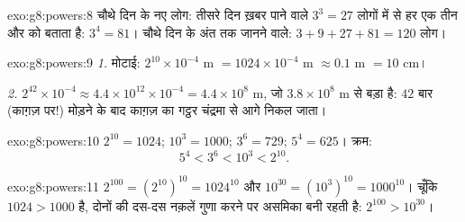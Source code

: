 \begin{solution}{exo:g8:powers:8}
चौथे दिन के नए लोग: तीसरे दिन ख़बर पाने वाले $3^3 = 27$ लोगों में
से हर एक तीन और को बताता है: $3^4 = 81$। चौथे दिन के अंत तक जानने
वाले: $3 + 9 + 27 + 81 = 120$ लोग।
\end{solution}

\begin{solution}{exo:g8:powers:9}
\emph{1.} मोटाई: $2^{10} \times 10^{-4}$ m
$= 1024 \times 10^{-4}$ m $\approx 0.1$ m $= 10$ cm।

\emph{2.} $2^{42} \times 10^{-4} \approx 4.4 \times 10^{12} \times
10^{-4} = 4.4 \times 10^8$ m, जो $3.8 \times 10^8$ m से बड़ा है:
$42$ बार (काग़ज़ पर!) मोड़ने के बाद काग़ज़ का गट्ठर चंद्रमा से आगे
निकल जाता।
\end{solution}

\begin{solution}{exo:g8:powers:10}
$2^{10} = 1024$; $10^3 = 1000$; $3^6 = 729$; $5^4 = 625$। क्रम:
\[
5^4 < 3^6 < 10^3 < 2^{10} .
\]
\end{solution}

\begin{solution}{exo:g8:powers:11}
$2^{100} = \left(2^{10}\right)^{10} = 1024^{10}$ और
$10^{30} = \left(10^3\right)^{10} = 1000^{10}$। चूँकि
$1024 > 1000$ है, दोनों की दस-दस नक़लें गुणा करने पर असमिका बनी
रहती है: $2^{100} > 10^{30}$।
\end{solution}

